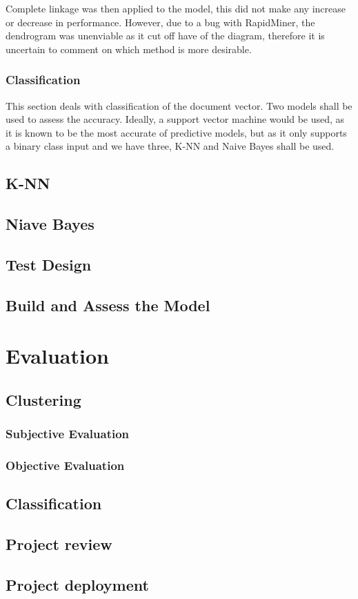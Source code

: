 Complete linkage was then applied to the model, this did not make any increase or decrease in performance. However, due to a bug with RapidMiner, the dendrogram was unenviable as it cut off have of the diagram, therefore it is uncertain to comment on which method is more desirable. 



\subsubsection*{Classification}
This section deals with classification of the document vector. Two models shall be used to assess the accuracy. Ideally, a support vector machine would be used, as it is known to be the most accurate of predictive models, but as it only supports a binary class input and we have three, K-NN and Naive Bayes shall be used.
\subsection*{K-NN}

\subsection*{Niave Bayes}

\subsection*{Test Design}

\subsection*{Build and Assess the Model}


\section*{Evaluation}

\subsection*{Clustering}
\subsubsection*{Subjective Evaluation}
\subsubsection*{Objective Evaluation}

\subsection*{Classification}

\subsection*{Project review}

\subsection*{Project deployment}


